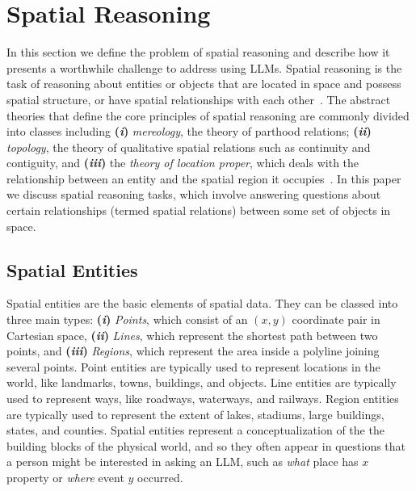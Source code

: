 \section{Spatial Reasoning}
\label{section:background}

In this section we define the problem of spatial reasoning and describe how it presents a worthwhile challenge to address using LLMs.
%
Spatial reasoning is the task of reasoning about entities or objects that are located in space and possess spatial structure, or have spatial relationships with each other~\cite{Varzi2007}.
The abstract theories that define the core principles of spatial reasoning are commonly divided into classes including 
\textbf{(\textit{i})} \textit{mereology}, the theory of parthood relations;
\textbf{(\textit{ii})} \textit{topology}, the theory of qualitative spatial relations such as continuity and contiguity, and 
\textbf{(\textit{iii})} the \textit{theory of location proper}, which deals with the relationship between an entity and the spatial region it
occupies~\cite{Varzi2007}.
%
In this paper we discuss spatial reasoning tasks, which involve answering questions about certain relationships (termed spatial relations) between some set of objects in space.


\subsection{Spatial Entities}
Spatial entities are the basic elements of spatial data.
They can be classed into three main types: \textbf{(\textit{i})} \textit{Points}, which consist of an $(x,y)$ coordinate pair in Cartesian space, \textbf{(\textit{ii})} \textit{Lines}, which represent the shortest path between two points, and \textbf{(\textit{iii})} \textit{Regions}, which represent the area inside a polyline joining several points. 
Point entities are typically used to represent locations in the world, like landmarks, towns, buildings, and objects.
Line entities are typically used to represent ways, like roadways, waterways, and railways.
Region entities are typically used to represent the extent of lakes, stadiums, large buildings, states, and counties.
Spatial entities represent a conceptualization of the the building blocks of the physical world, and so they often appear in questions that a person might be interested in asking an LLM, such as \textit{what} place has $x$ property or \textit{where} event $y$ occurred.


